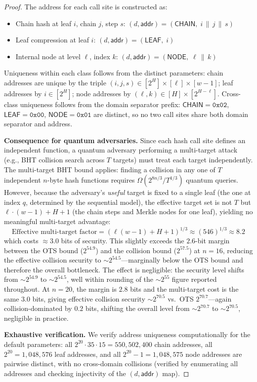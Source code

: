 \documentclass[11pt]{article}
\newcommand{\concat}{\,\|\,}
\begin{document}
\begin{proof}
The address for each call site is constructed as:
\begin{itemize}
\item Chain hash at leaf $i$, chain $j$, step $s$:
$(d, \mathsf{addr}) = (\mathsf{CHAIN},\; i \concat j \concat s)$
\item Leaf compression at leaf $i$:
$(d, \mathsf{addr}) = (\mathsf{LEAF},\; i)$
\item Internal node at level $\ell$, index $k$:
$(d, \mathsf{addr}) = (\mathsf{NODE},\; \ell \concat k)$
\end{itemize}

Uniqueness within each class follows from the distinct parameters:
chain addresses are unique by the triple $(i, j, s) \in [2^H] \times
[\ell] \times [w-1]$; leaf addresses by $i \in [2^H]$; node addresses
by $(\ell, k) \in [H] \times [2^{H-\ell}]$. Cross-class uniqueness
follows from the domain separator prefix: $\mathsf{CHAIN} = \mathtt{0x02}$,
$\mathsf{LEAF} = \mathtt{0x00}$, $\mathsf{NODE} = \mathtt{0x01}$ are
distinct, so no two call sites share both domain separator and address.

\textbf{Consequence for quantum adversaries.} Since each hash call
site defines an independent function, a quantum adversary performing a
multi-target attack (e.g., BHT collision search across $T$ targets)
must treat each target independently. The multi-target BHT bound
applies: finding a collision in any one of $T$ independent $n$-byte
hash functions requires $\Omega(2^{8n/3} / T^{1/3})$ quantum queries.
However, because the adversary's \emph{useful} target is fixed to a
single leaf (the one at index $q$, determined by the sequential model),
the effective target set is not $T$ but $\ell \cdot (w-1) + H + 1$
(the chain steps and Merkle nodes for one leaf), yielding no meaningful
multi-target advantage:
\[
\text{Effective multi-target factor} =
(\ell(w-1) + H + 1)^{1/3} \approx (546)^{1/3} \approx 8.2
\]
which costs $\approx 3.0$ bits of security. This slightly exceeds the
$2.6$-bit margin between the OTS bound ($2^{54.9}$) and the collision
bound ($2^{57.5}$) at $n = 16$, reducing the effective collision
security to ${\sim}2^{54.5}$---marginally below the OTS bound and
therefore the overall bottleneck. The effect is negligible: the
security level shifts from ${\sim}2^{54.9}$ to ${\sim}2^{54.5}$,
well within rounding of the ${\sim}2^{55}$ figure reported throughout.
At $n = 20$, the margin is $2.8$ bits and the multi-target cost is
the same $3.0$ bits, giving effective collision security
${\sim}2^{70.5}$ vs.\ OTS $2^{70.7}$---again collision-dominated
by $0.2$ bits, shifting the overall level from ${\sim}2^{70.7}$ to
${\sim}2^{70.5}$, negligible in practice.

\textbf{Exhaustive verification.} We verify address uniqueness
computationally for the default parameters: all $2^{20} \cdot 35 \cdot
15 = 550{,}502{,}400$ chain addresses, all $2^{20} = 1{,}048{,}576$
leaf addresses, and all $2^{20} - 1 = 1{,}048{,}575$ node addresses
are pairwise distinct, with no cross-domain collisions (verified by
enumerating all addresses and checking injectivity of the
$(d, \mathsf{addr})$ map).
\end{proof}
\end{document}
